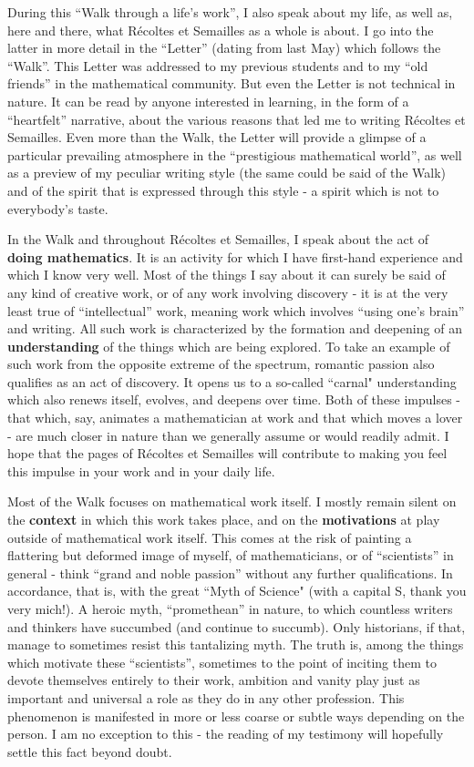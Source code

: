 During this ``Walk through a life's work'', 
I also speak about my life,
as well as, here and there, what 
R\'ecoltes et Semailles as a whole
is about.
I go into the latter in more detail in the ``Letter'' 
(dating from last May) which
follows the ``Walk''. 
This Letter was addressed to my
previous students and to my ``old friends'' in the mathematical community. 
But even the Letter is not technical in nature. 
It can be read by anyone
interested in learning,
in the form of a ``heartfelt'' narrative, about the various reasons that led me to writing 
R\'ecoltes et Semailles. Even more than the Walk, the Letter will provide a 
glimpse of a particular prevailing atmosphere in the ``prestigious mathematical world'',
as well as a preview of my peculiar writing style (the same could be said of the Walk) and of the
spirit that is expressed through this style - a spirit which is not to everybody's taste. 

In the Walk and throughout R\'ecoltes et Semailles, I speak about the act of 
\textbf{doing mathematics}.
It is an activity for which I have first-hand experience and which I know very well. Most of the
things I say about it can surely be said of any kind of creative work, or of any work involving
discovery - it is at the very least true of ``intellectual''
work, meaning work which involves ``using one's brain'' and writing. 
All such work is characterized by the formation and deepening of an
\textbf{understanding} of the things which are being explored. 
To take an example of such work from the 
opposite extreme of the spectrum, romantic passion also qualifies as an act of discovery. 
It opens us to a so-called ``carnal" understanding which also renews itself, evolves, and deepens over time. 
Both of these impulses - 
that which, say, animates a mathematician at work and
that which moves a lover 
- are much closer in nature than we generally assume or would readily admit. 
I hope that the pages of 
R\'ecoltes et Semailles 
will contribute to making you feel this impulse in your work and in your daily life. 

Most of the Walk focuses on mathematical work itself. 
I mostly remain silent on the \textbf{context} in which this work takes place, and
on the \textbf{motivations} at play outside of mathematical work itself. 
This comes at the risk of painting a flattering but deformed image of myself, of mathematicians, or of ``scientists'' in general - think ``grand and noble passion'' without any further qualifications.
In accordance, that is, with the great ``Myth of Science" 
(with a capital S, thank you very mich!).
A heroic myth, ``promethean'' in nature, to which countless writers and thinkers have succumbed 
(and continue to succumb). 
Only historians, if that, manage to sometimes resist this tantalizing myth. 
The truth is, among the things which motivate these ``scientists'',
sometimes to the point of inciting them to devote themselves entirely to their work, ambition and vanity
play just as important and universal a role as they do in any other profession. 
This phenomenon 
is manifested in
more or less coarse or subtle ways depending on the person. I am no exception to this -
the reading of my testimony will hopefully settle this fact beyond doubt. 

